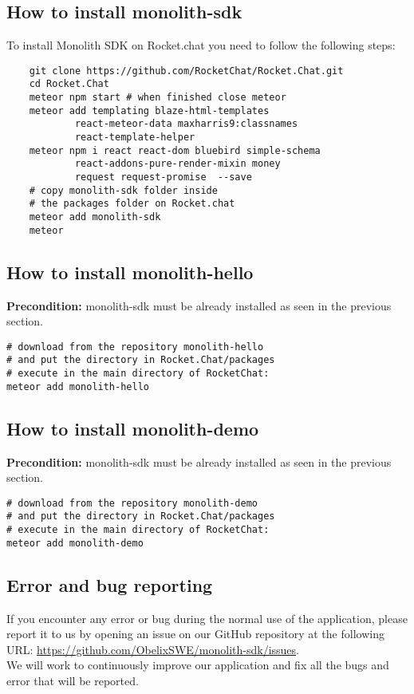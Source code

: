 \subsection{How to install monolith-sdk}
To install Monolith SDK on Rocket.chat you need to follow the following steps:

\begin{lstlisting}
    git clone https://github.com/RocketChat/Rocket.Chat.git
    cd Rocket.Chat
    meteor npm start # when finished close meteor
    meteor add templating blaze-html-templates
    		react-meteor-data maxharris9:classnames
    		react-template-helper	
    meteor npm i react react-dom bluebird simple-schema
    		react-addons-pure-render-mixin money
    		request request-promise  --save
    # copy monolith-sdk folder inside
    # the packages folder on Rocket.chat
    meteor add monolith-sdk
    meteor
\end{lstlisting}

\subsection{How to install monolith-hello}
\textbf{Precondition:} monolith-sdk must be already installed as seen in the previous section.

\begin{lstlisting}
# download from the repository monolith-hello
# and put the directory in Rocket.Chat/packages
# execute in the main directory of RocketChat:
meteor add monolith-hello
\end{lstlisting}

\subsection{How to install monolith-demo}
\textbf{Precondition:} monolith-sdk must be already installed as seen in the previous section.

\begin{lstlisting}
# download from the repository monolith-demo 
# and put the directory in Rocket.Chat/packages
# execute in the main directory of RocketChat:
meteor add monolith-demo
\end{lstlisting}




\subsection{Error and bug reporting}
If you encounter any error or bug during the normal use of the
application, please report it to us by opening an issue on our GitHub
repository at the following URL:
\url{https://github.com/ObelixSWE/monolith-sdk/issues}. \\ 
We will work to continuously improve our application and fix all the bugs and error that will be reported. 

